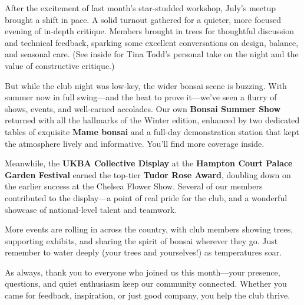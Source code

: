 \noindent  
After the excitement of last month's star\--studded workshop, July's meetup brought a shift in pace.
A solid turnout gathered for a quieter, more focused evening of in\--depth critique.
Members brought in trees for thoughtful discussion and technical feedback, sparking some excellent conversations on design, balance, and seasonal care.
(See inside for Tina Todd's personal take on the night and the value of constructive critique.)

\medskip  
But while the club night was low\--key, the wider bonsai scene is buzzing.
With summer now in full swing---and the heat to prove it---we've seen a flurry of shows, events, and well\--earned accolades.
Our own \textbf{Bonsai Summer Show} returned with all the hallmarks of the Winter edition, enhanced by two dedicated tables of exquisite \textbf{Mame bonsai} and a full\--day demonstration station that kept the atmosphere lively and informative.
You'll find more coverage inside.

\medskip  
Meanwhile, the \textbf{UKBA Collective Display} at the \textbf{Hampton Court Palace Garden Festival} earned the top\--tier \textbf{Tudor Rose Award}, doubling down on the earlier success at the Chelsea Flower Show.
Several of our members contributed to the display---a point of real pride for the club, and a wonderful showcase of national\--level talent and teamwork.

\medskip  
More events are rolling in across the country, with club members showing trees, supporting exhibits, and sharing the spirit of bonsai wherever they go.
Just remember to water deeply (your trees and yourselves!) as temperatures soar.

\medskip  
As always, thank you to everyone who joined us this month---your presence, questions, and quiet enthusiasm keep our community connected.
Whether you came for feedback, inspiration, or just good company, you help the club thrive.



